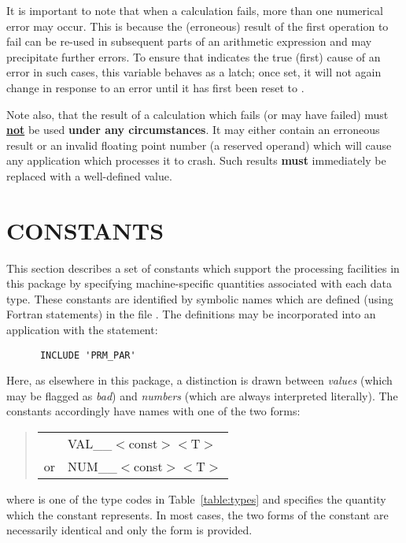 It is important to note that when a calculation fails, more than
one numerical error may occur.
This is because the (erroneous) result of the first operation to fail can be
re-used in subsequent parts of an arithmetic expression and may precipitate
further errors.
To ensure that  indicates the true (first) cause of an error
in such cases, this variable behaves as a latch; once set, it will not again
change in response to an error until it has first been reset to
.

Note also, that the result of a calculation which fails (or may have
failed) must {\bf \underline{not}} be used {\bf under any circumstances}.
It may either contain an erroneous result or an invalid floating point
number (a reserved operand) which will cause any application which processes
it to crash.
Such results {\bf must} immediately be replaced with a well-defined value.

\section{CONSTANTS}

\label{section:constants}

This section describes a set of constants which support the processing
facilities in this package by specifying machine-specific quantities
associated with each data type.
These constants are identified by symbolic names which are defined (using
Fortran  statements) in the file .
The definitions may be incorporated into an application with the statement:

\begin{verbatim}
      INCLUDE 'PRM_PAR'
\end{verbatim}

Here, as elsewhere in this package, a distinction is drawn between {\em
values} (which may be flagged as {\em bad}) and {\em numbers} (which are
always interpreted literally).
The constants accordingly have names with one of the two forms:

\begin{quote}
\begin{tabular}{rl}
& VAL\_\_$<$const$><$T$>$\\
or & NUM\_\_$<$const$><$T$>$
\end{tabular}
\end{quote}

where  is one of the type codes in Table~\ref{table:types} and
 specifies the quantity which the constant represents.
In most cases, the two forms of the constant are necessarily identical and
only the  form is provided.

